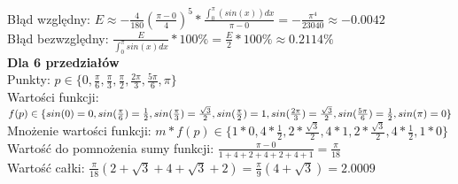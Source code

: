 \documentclass{article}
\begin{document}
Błąd względny: $E\approx-\frac{4}{180}(\frac{\pi-0}{4})^5*\frac{\int_{0}^{\pi}(sin(x))dx}{\pi-0} = -\frac{\pi^4}{23040} \approx -0.0042$\\
Błąd bezwzględny: $\frac{E}{\int_{0}^{\pi}sin(x)dx}*100\%=\frac{E}{2}*100\% \approx 0.2114\%$\\
\textbf{Dla 6 przedziałów}\\
Punkty: $p \in \{0, \frac{\pi}{6}, \frac{\pi}{3}, \frac{\pi}{2}, \frac{2\pi}{3}, \frac{5\pi}{6}, \pi\}$\\
Wartości funkcji: $f(p) \in \{sin(0)=0, sin(\frac{\pi}{6})=\frac{1}{2}, sin(\frac{\pi}{3})=\frac{\sqrt{3}}{2}, sin(\frac{\pi}{2})=1, sin(\frac{2\pi}{3})=\frac{\sqrt{3}}{2}, \\sin(\frac{5\pi}{6})=\frac{1}{2}, sin(\pi)=0\}$\\
Mnożenie wartości funkcji: $m*f(p) \in \{1*0, 4*\frac{1}{2}, 2*\frac{\sqrt{3}}{2}, 4*1, 2*\frac{\sqrt{3}}{2}, 4*\frac{1}{2}, 1*0\}$\\
Wartość do pomnożenia sumy funkcji: $\frac{\pi-0}{1+4+2+4+2+4+1}=\frac{\pi}{18}$\\
Wartość całki: $\frac{\pi}{18}(2+\sqrt{3}+4+\sqrt{3}+2)=\frac{\pi}{9}(4+\sqrt{3})=2.0009$\\
\end{document}
